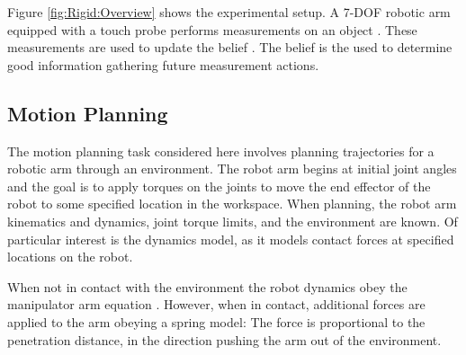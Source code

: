 \documentclass[../thesis.tex]{subfiles}
\begin{document}

Figure \ref{fig:Rigid:Overview} shows the experimental setup.
A 7-DOF robotic arm equipped with a touch probe performs measurements on an object .
These measurements are used to update the belief . The belief is the used to determine good information gathering future measurement actions.


\subsection{Motion Planning}
The motion planning task considered here involves planning trajectories for a robotic arm through an environment.
The robot arm begins at initial joint angles and the goal is to apply torques on the joints to move the end effector of the robot to some specified location in the workspace.
When planning, the robot arm kinematics and dynamics, joint torque limits, and the environment are known.
Of particular interest is the dynamics model, as it models contact forces at specified locations on the robot.

When not in contact with the environment the robot dynamics obey the manipulator arm equation \cite{murray1994mathematical}.
However, when in contact, additional forces are applied to the arm obeying a spring model: The force is proportional to the penetration distance, in the direction pushing the arm out of the environment.
\end{document}
